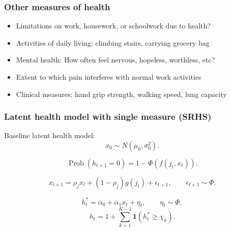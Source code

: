 \documentclass[aspectratio=169]{beamer}
\newcommand{\Prob}{\operatorname{Prob}}
\begin{document}
\begin{frame}\frametitle{Other measures of health}
\begin{itemize}
	\item <1->Limitations on work, housework, or schoolwork due to health?
	
	\item <2->Activities of daily living: climbing stairs, carrying grocery bag
	
	\item <3->Mental health: How often feel nervous, hopeless, worthless, etc?
	
	\item <4->Extent to which pain interferes with normal work activities
	
	\item <5->Clinical measures: hand grip strength, walking speed, lung capacity
\end{itemize}
\end{frame}


\begin{frame}\frametitle{Latent health model with single measure (SRHS)}
Baseline latent health model:
\setcounter{equation}{0}
\begin{equation}
x_0 \sim N(\mu_0, \sigma^2_0).
\end{equation}

\begin{equation}
\Prob(h_{t+1} = 0) = 1 - \Phi(f(j_t,x_t)).
\end{equation}

\begin{equation}
x_{t+1} = \rho_{j} x_t + (1-\rho_j)g(j_t) + \epsilon_{t+1}, \qquad \epsilon_{t+1} \sim \Phi.
\end{equation}

\begin{equation}
h^*_t = \alpha_0 + \alpha_1 x_t + \eta_t, \qquad \eta_t \sim \Phi,
\end{equation}
\begin{equation*}
h_t = 1 + \sum_{k = 1}^{K-1} \mathbf{1}(h^*_t \geq \chi_k). 
\end{equation*}
\end{frame}
\end{document}
